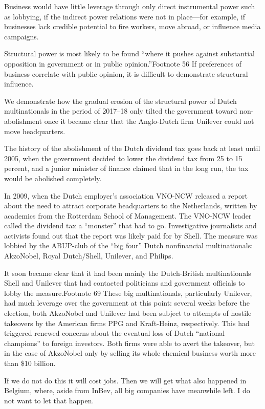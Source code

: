 \documentclass[
]{book}
\begin{document}
Business would have little leverage through only direct instrumental power such as lobbying, if the indirect power relations were not in place---for example, if businesses lack credible potential to fire workers, move abroad, or influence media campaigns.

Structural power is most likely to be found ``where it pushes against substantial opposition in government or in public opinion.''Footnote 56 If preferences of business correlate with public opinion, it is difficult to demonstrate structural influence.

We demonstrate how the gradual erosion of the structural power of Dutch multinationals in the period of 2017--18 only tilted the government toward non-abolishment once it became clear that the Anglo-Dutch firm Unilever could not move headquarters.

The history of the abolishment of the Dutch dividend tax goes back at least until 2005, when the government decided to lower the dividend tax from 25 to 15 percent, and a junior minister of finance claimed that in the long run, the tax would be abolished completely.

In 2009, when the Dutch employer's association VNO-NCW released a report about the need to attract corporate headquarters to the Netherlands, written by academics from the Rotterdam School of Management. The VNO-NCW leader called the dividend tax a ``monster'' that had to go.
Investigative journalists and activists found out that the report was likely paid for by Shell.
The measure was lobbied by the ABUP-club of the ``big four'' Dutch nonfinancial multinationals: AkzoNobel, Royal Dutch/Shell, Unilever, and Philips.

It soon became clear that it had been mainly the Dutch-British multinationals Shell and Unilever that had contacted politicians and government officials to lobby the measure.Footnote 69 These big multinationals, particularly Unilever, had much leverage over the government at this point: several weeks before the election, both AkzoNobel and Unilever had been subject to attempts of hostile takeovers by the American firms PPG and Kraft-Heinz, respectively. This had triggered renewed concerns about the eventual loss of Dutch ``national champions'' to foreign investors. Both firms were able to avert the takeover, but in the case of AkzoNobel only by selling its whole chemical business worth more than \$10 billion.

If we do not do this it will cost jobs. Then we will get what also happened in Belgium, where, aside from InBev, all big companies have meanwhile left. I do not want to let that happen.
\end{document}
